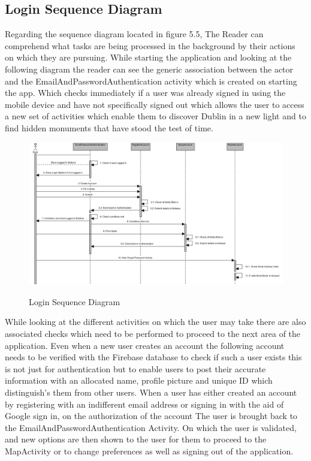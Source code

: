 \subsection{Login Sequence Diagram}
Regarding the sequence diagram located in figure 5.5, The Reader can comprehend what tasks are being processed in the background by their actions on which they are pursuing. While starting the application and looking at the following diagram the reader can see the generic association between the actor and the EmailAndPasswordAuthentication activity which is created on starting the app. Which checks immediately if a user was already signed in using the mobile device and have not specifically signed out which allows the user to access a new set of activities which enable them to discover Dublin in a new light and to find hidden monuments that have stood the test of time.\par

\begin{figure}[htbp]
    \center \includegraphics[width=500pt]{Login&RegisterSequence}\\
    \caption{Login Sequence Diagram } \label{Figure: Sequence Diagram}
\end{figure}

\par
While looking at the different activities on which the user may take there are also associated checks which need to be performed to proceed to the next area of the application. Even when a new user creates an account the following account needs to be verified with the Firebase database to check if such a user exists this is not just for authentication but to enable users to post their accurate information with an allocated name, profile picture and unique ID which distinguish's them from other users. When a user has either created an account by registering with an indifferent email address or signing in with the aid of Google sign in, on the authorization of the account The user is brought back to the EmailAndPasswordAuthentication Activity. On which the user is validated, and new options are then shown to the user for them to proceed to the MapActivity or to change preferences as well as signing out of the application.

